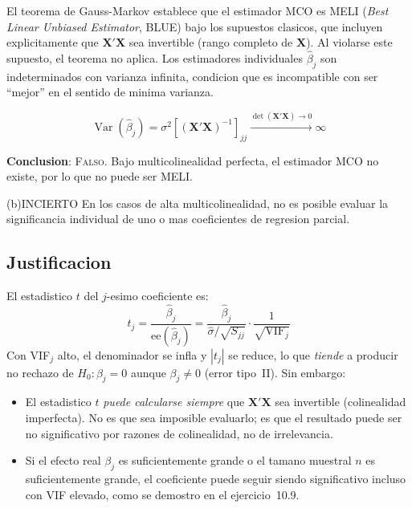 \documentclass[12pt, letterpaper]{article}
\theoremstyle{remark}
\newcommand{\Var}{\operatorname{Var}}
\begin{document}
El teorema de Gauss-Markov establece que el estimador MCO es MELI
(\textit{Best Linear Unbiased Estimator}, BLUE) bajo los supuestos clasicos,
que incluyen explicitamente que $\mathbf{X'X}$ sea invertible (rango completo
de $\mathbf{X}$). Al violarse este supuesto, el teorema no aplica. Los
estimadores individuales $\hat\beta_j$ son indeterminados con varianza infinita,
condicion que es incompatible con ser ``mejor'' en el sentido de minima varianza.

\begin{equation}
  \Var(\hat\beta_j) = \sigma^2 [(\mathbf{X'X})^{-1}]_{jj}
  \xrightarrow{\det(\mathbf{X'X}) \to 0} \infty
  \label{eq:var_inf}
\end{equation}

\textbf{Conclusion}: \textsc{Falso}. Bajo multicolinealidad perfecta, el
estimador MCO no existe, por lo que no puede ser MELI.

\bigskip

\begin{verdict}{(b)}{INCIERTO}
  En los casos de alta multicolinealidad, no es posible evaluar la significancia
  individual de uno o mas coeficientes de regresion parcial.
\end{verdict}

\subsection*{Justificacion}

El estadistico $t$ del $j$-esimo coeficiente es:
\begin{equation}
  t_j = \frac{\hat\beta_j}{\text{ee}(\hat\beta_j)}
       = \frac{\hat\beta_j}{\hat\sigma/\sqrt{S_{jj}}} \cdot \frac{1}{\sqrt{\text{VIF}_j}}
  \label{eq:t_vif}
\end{equation}
Con VIF$_j$ alto, el denominador se infla y $|t_j|$ se reduce, lo que
\emph{tiende} a producir no rechazo de $H_0: \beta_j = 0$ aunque $\beta_j \neq 0$
(error tipo~II). Sin embargo:

\begin{itemize}[leftmargin=1.6em, itemsep=3pt]
  \item El estadistico $t$ \emph{puede calcularse siempre} que $\mathbf{X'X}$
    sea invertible (colinealidad imperfecta). No es que sea imposible evaluarlo;
    es que el resultado puede ser no significativo por razones de colinealidad,
    no de irrelevancia.
  \item Si el efecto real $\beta_j$ es suficientemente grande o el tamano
    muestral $n$ es suficientemente grande, el coeficiente puede seguir siendo
    significativo incluso con VIF elevado, como se demostro en el ejercicio~10.9.
\end{itemize}
\end{document}
